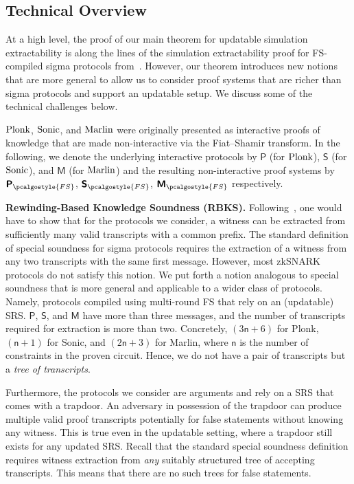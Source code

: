\documentclass[10pt]{llncs}
\newcommand{\pcvarstyle}[1]{\mathsf{#1}}
\newcommand{\numberofconstrains}{\pcvarstyle{n}}
\newcommand{\noofc}{\numberofconstrains}
\newcommand{\multconstr}{\pcvarstyle{Q_{mult}}}
\newcommand{\linconstr}{\pcvarstyle{Q_{lin}}}
\newcommand{\fs}{\pcalgostyle{FS}}
\newcommand{\pcschemestyle}[1]{\bm{\mathsf{#1}}}
\newcommand{\plonkprot}{\pcschemestyle{P}}
\newcommand{\plonkprotfs}{\pcschemestyle{P}_\fs}
\newcommand{\sonicprot}{\pcschemestyle{S}}
\newcommand{\sonicprotfs}{\pcschemestyle{S}_\fs}
\newcommand{\marlinprot}{\pcschemestyle{M}}
\newcommand{\marlinprotfs}{\pcschemestyle{M}_\fs}
\newcommand{\plonk}{\ensuremath{\textnormal{{Plonk}}}}
\newcommand{\marlin}{{\ensuremath{\textnormal{{Marlin}}}}}
\newcommand{\sonic}{{\ensuremath{\textnormal{{Sonic}}}}}
\newcommand{\oursubsub}[1] {\smallskip\noindent\textbf{#1}}
\begin{document}
\subsection{Technical Overview}

At a high level, the proof of our main theorem for updatable simulation
extractability is along the lines of the simulation extractability proof for
FS-compiled sigma protocols from~\cite{INDOCRYPT:FKMV12}. However, our theorem
introduces new notions that are more general to allow us to consider proof
systems that are richer than sigma protocols and support an updatable setup. We
discuss some of the technical challenges below.

\plonk{}, \sonic{}, and \marlin{} were originally presented as interactive
proofs of knowledge that are made non-interactive via the Fiat--Shamir transform.
In the following, we denote the underlying interactive protocols by $\plonkprot$
(for $\plonk$), $\sonicprot$ (for $\sonic$), and $\marlinprot$ (for \marlin) and
the resulting non-interactive proof systems by $\plonkprotfs$, $\sonicprotfs$,
$\marlinprotfs$ respectively.

\oursubsub{Rewinding-Based Knowledge Soundness (RBKS).}
Following~\cite{INDOCRYPT:FKMV12}, one would have to show that for the protocols
we consider, a witness can be extracted from sufficiently many valid transcripts
with a common prefix. The standard definition of special soundness for sigma
protocols requires the extraction of a witness from any two transcripts with the
same first message. However, most zkSNARK protocols do not satisfy this notion.
We put forth a notion analogous to special soundness that is more general and
applicable to a wider class of protocols. Namely, protocols compiled using multi-round FS that rely on an (updatable) SRS. $\plonkprot$, $\sonicprot$, and
$\marlinprot$ have more than three messages, and the number of transcripts required for extraction is more than two. Concretely, $(3 \noofc + 6)$ for Plonk,  $(\noofc + 1)$ for Sonic,
and $(2 \noofc + 3)$ for Marlin, where $\noofc$ is the number of constraints in the proven circuit. Hence, we do not have a pair of transcripts but a \emph{tree of transcripts}.

Furthermore, the protocols we consider are arguments and rely on a SRS that comes with a trapdoor. An adversary in
possession of the trapdoor can produce multiple valid proof transcripts potentially for false statements without
knowing any witness. This is true even in
the updatable setting, where a trapdoor still exists for any updated SRS. Recall
that the standard special soundness definition requires witness extraction from
\emph{any} suitably structured tree of accepting transcripts. This means
that there are no such trees for false statements. 
\end{document}
